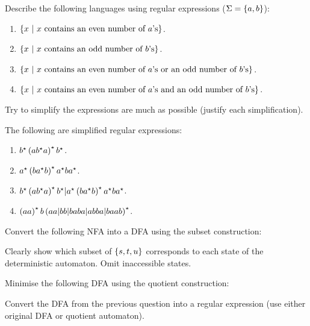 \documentclass{article}
\begin{document}
\begin{exercise}
Describe the following languages using regular expressions ($\Sigma=\left\{ a,b \right\}$):
\begin{enumerate}
 \item $\left\{ x\ |\ \mbox{$x$ contains an even number of $a$'s} \right\}$.
 \item $\left\{ x\ |\ \mbox{$x$ contains an odd number of $b$'s} \right\}$.
 \item $\left\{ x\ |\ \mbox{$x$ contains an even number of $a$'s or an odd number of $b$’s} \right\}$.
 \item $\left\{ x\ |\ \mbox{$x$ contains an even number of $a$'s and an odd number of $b$’s} \right\}$.
\end{enumerate}
Try to simplify the expressions are much as possible (justify each simplification).
\begin{answer}
The following are simplified regular expressions:
\begin{enumerate}
 \item $b^{\star}\left( ab^{\star}a \right)^{\star}b^{\star}$.
 \item $a^{\star}\left( ba^{\star}b \right)^{\star}a^{\star}ba^{\star}$.
 \item $b^{\star}\left( ab^{\star}a \right)^{\star}b^{\star}|a^{\star}\left( ba^{\star}b \right)^{\star}a^{\star}ba^{\star}$.
 \item $\left( aa \right)^{\star}b\left( aa|bb|baba|abba|baab \right)^{\star}$.
\end{enumerate}
\end{answer}
\end{exercise}
\begin{exercise}
Convert the following NFA into a DFA using the subset construction:


Clearly show which subset of $\left\{ s,t,u \right\}$ corresponds to each state of the deterministic automaton. Omit inaccessible states.
\begin{answer}
\end{answer}
\end{exercise}
\begin{exercise}
Minimise the following DFA using the quotient construction:
\begin{answer}
\end{answer}
\end{exercise}
\begin{exercise}
Convert the DFA from the previous question into a regular expression (use either original DFA or quotient automaton).
\begin{answer}
\end{answer}
\end{exercise}
\end{document}
